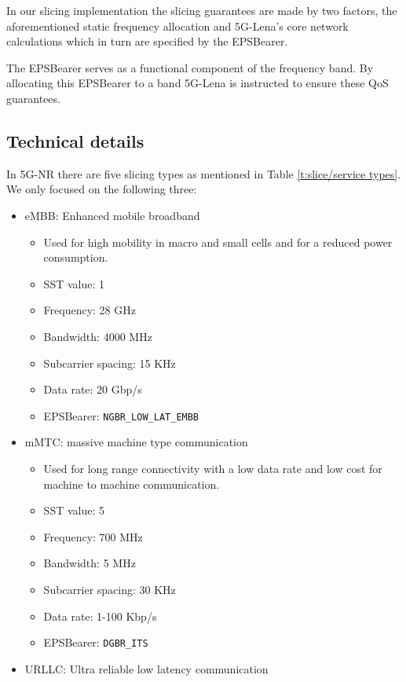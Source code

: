     In our slicing implementation the slicing guarantees are made by two factors, the aforementioned static frequency allocation and 5G-Lena's core network calculations which in turn are specified by the EPSBearer. 
    
    The EPSBearer serves as a functional component of the frequency band. By allocating this EPSBearer to a band 5G-Lena is instructed to ensure these QoS guarantees.
    
    \subsection{Technical details}
    In 5G-NR there are five slicing types as mentioned in Table \ref{t:slice/service types}. We only focused on the following three:
    \begin{itemize}
        \item eMBB: Enhanced mobile broadband
        \begin{itemize}
            \item Used for high mobility in macro and small cells and for a reduced power consumption.
            \item SST value: 1
            \item Frequency: 28 GHz
            \item Bandwidth: 4000 MHz
            \item Subcarrier spacing: 15 KHz
            \item Data rate: 20 Gbp/s
            \item EPSBearer: \verb!NGBR_LOW_LAT_EMBB!
        \end{itemize}
        \item mMTC: massive machine type communication
        \begin{itemize}
            \item Used for long range connectivity with a low data rate and low cost for machine to machine communication.
            \item SST value: 5
            \item Frequency: 700 MHz
            \item Bandwidth: 5 MHz
            \item Subcarrier spacing: 30 KHz
            \item Data rate: 1-100 Kbp/s
            \item EPSBearer: \verb!DGBR_ITS! 
        \end{itemize}
        \item URLLC: Ultra reliable low latency communication

\end{itemize}
